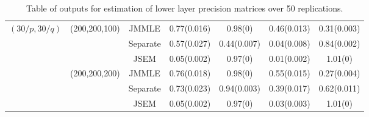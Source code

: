 \begin{scriptsize}
\begin{table}
\begin{tabular}{ccccccc}
    $(30/p, 30/q)$ & (200,200,100) & JMMLE    & 0.77(0.016) & 0.98(0)      & 0.46(0.013)  & 0.31(0.003) \\
    ~              & ~             & Separate & 0.57(0.027) & 0.44(0.007)  & 0.04(0.008)  & 0.84(0.002)\\
    ~              & ~             & JSEM     & 0.05(0.002) & 0.97(0)      & 0.01(0.002)  & 1.01(0)     \\\hline
    ~              & (200,200,200) & JMMLE    & 0.76(0.018)  & 0.98(0)     & 0.55(0.015)  & 0.27(0.004) \\
    ~              & ~             & Separate & 0.73(0.023) & 0.94(0.003)  & 0.39(0.017)  & 0.62(0.011)\\
    ~              & ~             & JSEM     & 0.05(0.002) & 0.97(0)      & 0.03(0.003)  & 1.01(0)     \\\hline
    \end{tabular}
    \caption{Table of outputs for estimation of lower layer precision matrices over 50 replications.}
    \label{table:simtable12}
\end{table}
\end{scriptsize}


